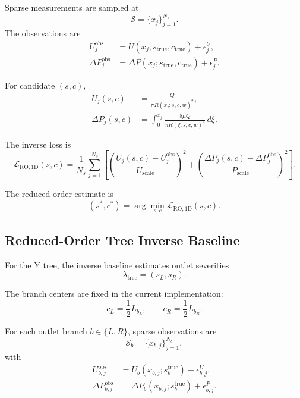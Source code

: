 \documentclass[11pt]{article}
\begin{document}
Sparse measurements are sampled at
\begin{equation}
    \mathcal{S}=\{x_j\}_{j=1}^{N_s}.
\end{equation}
The observations are
\begin{align}
    U_j^{\mathrm{obs}}
    &=
    U(x_j;s_{\mathrm{true}},c_{\mathrm{true}})
    +
    \epsilon_j^U,\\
    \Delta P_j^{\mathrm{obs}}
    &=
    \Delta P(x_j;s_{\mathrm{true}},c_{\mathrm{true}})
    +
    \epsilon_j^P.
\end{align}

For candidate $(s,c)$,
\begin{align}
    U_j(s,c)
    &=
    \frac{Q}{\pi R(x_j;s,c,w)^2},\\
    \Delta P_j(s,c)
    &=
    \int_{0}^{x_j}
    \frac{8\mu Q}{\pi R(\xi;s,c,w)^4}\,d\xi.
\end{align}

The inverse loss is
\begin{equation}
    \mathcal{L}_{\mathrm{RO,1D}}(s,c)
    =
    \frac{1}{N_s}
    \sum_{j=1}^{N_s}
    \left[
        \left(
            \frac{U_j(s,c)-U_j^{\mathrm{obs}}}
            {U_{\mathrm{scale}}}
        \right)^2
        +
        \left(
            \frac{\Delta P_j(s,c)-\Delta P_j^{\mathrm{obs}}}
            {P_{\mathrm{scale}}}
        \right)^2
    \right].
\end{equation}

The reduced-order estimate is
\begin{equation}
    (s^{\ast},c^{\ast})
    =
    \arg\min_{s,c}
    \mathcal{L}_{\mathrm{RO,1D}}(s,c).
\end{equation}

\subsection{Reduced-Order Tree Inverse Baseline}

For the Y tree, the inverse baseline estimates outlet severities
\begin{equation}
    \lambda_{\mathrm{tree}}=(s_L,s_R).
\end{equation}

The branch centers are fixed in the current implementation:
\begin{equation}
    c_L=\frac{1}{2}L_{b_L},
    \qquad
    c_R=\frac{1}{2}L_{b_R}.
\end{equation}

For each outlet branch $b\in\{L,R\}$, sparse observations are
\begin{equation}
    \mathcal{S}_b=\{x_{b,j}\}_{j=1}^{N_b},
\end{equation}
with
\begin{align}
    U_{b,j}^{\mathrm{obs}}
    &=
    U_b(x_{b,j};s_b^{\mathrm{true}})
    +
    \epsilon_{b,j}^{U},\\
    \Delta P_{b,j}^{\mathrm{obs}}
    &=
    \Delta P_b(x_{b,j};s_b^{\mathrm{true}})
    +
    \epsilon_{b,j}^{P}.
\end{align}
\end{document}
